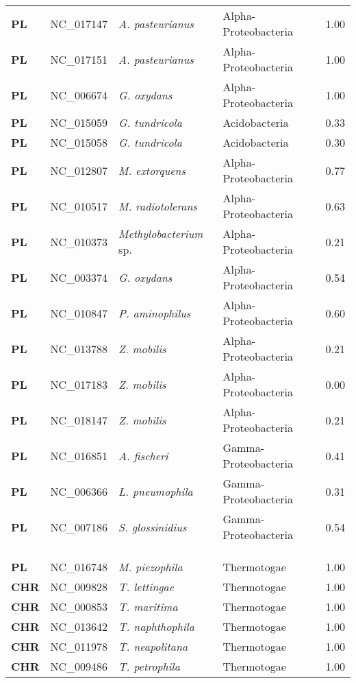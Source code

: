 \begin{adjustwidth}{-3cm}{2cm}
{\begin{supertabular}{>{\bfseries}l|p{0.1\textwidth}p{0.14\textwidth}l|l}
PL & NC\_017147 & \textit{A. pasteurianus} & Alpha-Proteobacteria & 1.00\\
PL & NC\_017151 & \textit{A. pasteurianus} & Alpha-Proteobacteria & 1.00\\
PL & NC\_006674 & \textit{G. oxydans} & Alpha-Proteobacteria & 1.00\\
PL & NC\_015059 & \textit{G. tundricola} & Acidobacteria & 0.33\\
PL & NC\_015058 & \textit{G. tundricola} & Acidobacteria & 0.30\\
PL & NC\_012807 & \textit{M. extorquens} & Alpha-Proteobacteria & 0.77\\
PL & NC\_010517 & \textit{M. radiotolerans} & Alpha-Proteobacteria & 0.63\\
PL & NC\_010373 & \textit{Methylobacterium} sp. & Alpha-Proteobacteria & 0.21\\
PL & NC\_003374 & \textit{G. oxydans} & Alpha-Proteobacteria & 0.54\\
PL & NC\_010847 & \textit{P. aminophilus} & Alpha-Proteobacteria & 0.60\\
PL & NC\_013788 & \textit{Z. mobilis} & Alpha-Proteobacteria & 0.21\\
PL & NC\_017183 & \textit{Z. mobilis} & Alpha-Proteobacteria & 0.00\\
PL & NC\_018147 & \textit{Z. mobilis} & Alpha-Proteobacteria & 0.21\\
PL & NC\_016851 & \textit{A. fischeri} & Gamma-Proteobacteria & 0.41\\
PL & NC\_006366 & \textit{L. pneumophila} & Gamma-Proteobacteria & 0.31\\
PL & NC\_007186 & \textit{S. glossinidius} & Gamma-Proteobacteria & 0.54\\
\\
\\
\hline\\
PL & NC\_016748 & \textit{M. piezophila} & Thermotogae & 1.00\\
CHR & NC\_009828 & \textit{T. lettingae} & Thermotogae & 1.00\\
CHR & NC\_000853 & \textit{T. maritima} & Thermotogae & 1.00\\
CHR & NC\_013642 & \textit{T. naphthophila} & Thermotogae & 1.00\\
CHR & NC\_011978 & \textit{T. neapolitana} & Thermotogae & 1.00\\
CHR & NC\_009486 & \textit{T. petrophila} & Thermotogae & 1.00\\

\end{supertabular}}
\end{adjustwidth}
